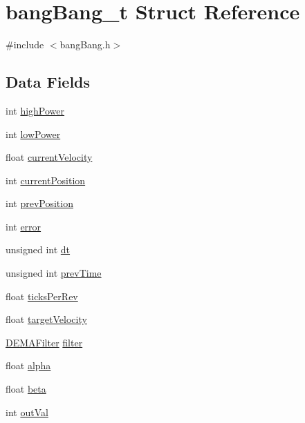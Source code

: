 \hypertarget{structbang_bang__t}{}\section{bang\+Bang\+\_\+t Struct Reference}
\label{structbang_bang__t}


{\ttfamily \#include $<$bang\+Bang.\+h$>$}

\subsection*{Data Fields}
\begin{DoxyCompactItemize}
\item 
int \hyperlink{structbang_bang__t_a4fa83d121f975392d13a6eafc8733e8c}{high\+Power}
\item 
int \hyperlink{structbang_bang__t_aceab3f97677be43214905c6d7e52713c}{low\+Power}
\item 
float \hyperlink{structbang_bang__t_aa2a8ba8cec3769a80c38571a2003a065}{current\+Velocity}
\item 
int \hyperlink{structbang_bang__t_a1bcd4cd879b6db220af55e2f47369763}{current\+Position}
\item 
int \hyperlink{structbang_bang__t_a08cad64e2f790f4758c6f4318449176c}{prev\+Position}
\item 
int \hyperlink{structbang_bang__t_a6ddb95529b8ae1300a3384545edb0255}{error}
\item 
unsigned int \hyperlink{structbang_bang__t_a3760eb8e81e1ff498cf4051e27dbc4eb}{dt}
\item 
unsigned int \hyperlink{structbang_bang__t_a9cb7011acdcf5b3c005effc1084d807c}{prev\+Time}
\item 
float \hyperlink{structbang_bang__t_aae2001616d202114e9557ea4b07158d9}{ticks\+Per\+Rev}
\item 
float \hyperlink{structbang_bang__t_a45c6612d984871c8051fe831a2a555d9}{target\+Velocity}
\item 
\hyperlink{filter_8h_a7dde035e516b0067d35e0a4580bec1f5}{D\+E\+M\+A\+Filter} \hyperlink{structbang_bang__t_abe3696ef27d37d55fc311b8081103bba}{filter}
\item 
float \hyperlink{structbang_bang__t_a9be6043971378f34c53204912a84c8ee}{alpha}
\item 
float \hyperlink{structbang_bang__t_a69060aab09568c270a0e19247a4f3f1c}{beta}
\item 
int \hyperlink{structbang_bang__t_aadbe1f8dec61e70a84a84d01cecb5d3e}{out\+Val}
\end{DoxyCompactItemize}


